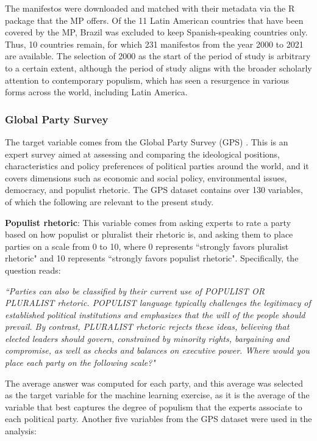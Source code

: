 \documentclass[12pt,letterpaper]{article}
\begin{document}
The manifestos were downloaded and matched with their metadata via the R package that the MP offers. Of the 11 Latin American countries that have been covered by the MP, Brazil was excluded to keep Spanish-speaking countries only. Thus, 10 countries remain, for which 231 manifestos from the year 2000 to 2021 are available. The selection of 2000 as the start of the period of study is arbitrary to a certain extent, although the period of study aligns with the broader scholarly attention to contemporary populism, which has seen a resurgence in various forms across the world, including Latin America.

\vspace{.25cm}
\subsubsection{Global Party Survey}

\vspace{.25cm}
\noindent The target variable comes from the Global Party Survey (GPS)\autocite{DownloadData} . This is an expert survey aimed at assessing and comparing the ideological positions, characteristics and policy preferences of political parties around the world, and it covers dimensions such as economic and social policy, environmental issues, democracy, and populist rhetoric. The GPS dataset contains over 130 variables, of which the following are relevant to the present study.

\textbf{Populist rhetoric}: This variable comes from asking experts to rate a party based on how populist or pluralist their rhetoric is, and asking them to place parties on a scale from 0 to 10, where 0 represents ``strongly favors pluralist rhetoric" and 10 represents ``strongly favors populist rhetoric". Specifically, the question reads:

\textit{``Parties can also be classified by their current use of POPULIST OR PLURALIST rhetoric. POPULIST language typically challenges the legitimacy of established political institutions and emphasizes that the will of the people should prevail. By contrast, PLURALIST rhetoric rejects these ideas, believing that elected leaders should govern, constrained by minority rights, bargaining and compromise, as well as checks and balances on executive power. Where would you place each party on the following scale?"}

The average answer was computed for each party, and this average was selected as the target variable for the machine learning exercise, as it is the average of the variable that best captures the degree of populism that the experts associate to each political party. Another five variables from the GPS dataset were used in the analysis: 
\end{document}
